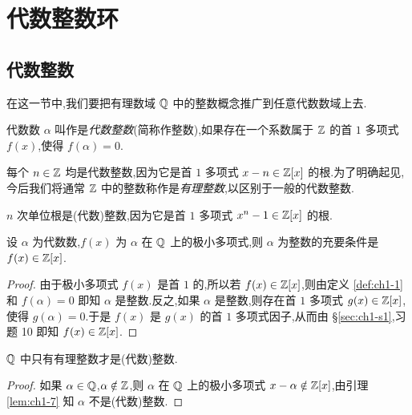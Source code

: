 \section{代数整数环}\label{sec:ch1-s2}

\subsection{代数整数}\label{sec:ch1-s2-1}

在这一节中,我们要把有理数域 $\mathbb{Q}$ 中的整数概念推广到任意代数数域上去.

\begin{definition}\label{def:ch1-1}
代数数 $\alpha$ 叫作是\emph{代数整数}(简称作整数),如果存在一个系数属于 $\mathbb{Z}$ 的首 $1$ 多项式 $f(x)$,使得 $f(\alpha)=0$.
\end{definition}

\begin{example}\label{ex:ch1-2-1}
每个 $n\in\mathbb{Z}$ 均是代数整数,因为它是首 $1$ 多项式 $x-n\in\mathbb{Z}[x]$ 的根.为了明确起见,今后我们将通常 $\mathbb{Z}$ 中的整数称作是\emph{有理整数},以区别于一般的代数整数.
\end{example}

\begin{example}\label{ex:ch1-2-2}
$n$ 次单位根是(代数)整数,因为它是首 $1$ 多项式 $x^n-1\in\mathbb{Z}[x]$ 的根.
\end{example}

\begin{lemma}\label{lem:ch1-7}
设 $\alpha$ 为代数数,$f(x)$ 为 $\alpha$ 在 $\mathbb{Q}$ 上的极小多项式,则 $\alpha$ 为整数的充要条件是 $f(x)\in\mathbb{Z}[x]$.
\end{lemma}

\begin{proof}
由于极小多项式 $f(x)$ 是首 $1$ 的,所以若 $f(x)\in\mathbb{Z}[x]$,则由定义 \ref{def:ch1-1} 和 $f(\alpha)=0$ 即知 $\alpha$ 是整数.反之,如果 $\alpha$ 是整数,则存在首 $1$ 多项式 $g(x)\in\mathbb{Z}[x]$,使得 $g(\alpha)=0$.于是 $f(x)$ 是 $g(x)$ 的首 $1$ 多项式因子,从而由 \S\ref{sec:ch1-s1},习题 10 即知 $f(x)\in\mathbb{Z}[x]$.
\end{proof}

\begin{corollarynonum}
$\mathbb{Q}$ 中只有有理整数才是(代数)整数.
\end{corollarynonum}

\begin{proof}
如果 $\alpha\in\mathbb{Q}$,$\alpha\notin\mathbb{Z}$,则 $\alpha$ 在 $\mathbb{Q}$ 上的极小多项式 $x-\alpha\notin\mathbb{Z}[x]$,由引理 \ref{lem:ch1-7} 知 $\alpha$ 不是(代数)整数.
\end{proof}

